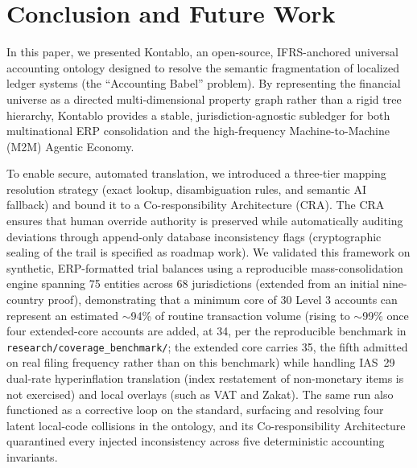 \section{Conclusion and Future Work}
\label{sec:conclusion}

In this paper, we presented Kontablo, an open-source, IFRS-anchored universal accounting ontology designed to resolve the semantic fragmentation of localized ledger systems (the ``Accounting Babel'' problem). By representing the financial universe as a directed multi-dimensional property graph rather than a rigid tree hierarchy, Kontablo provides a stable, jurisdiction-agnostic subledger for both multinational ERP consolidation and the high-frequency Machine-to-Machine (M2M) Agentic Economy.

To enable secure, automated translation, we introduced a three-tier mapping resolution strategy (exact lookup, disambiguation rules, and semantic AI fallback) and bound it to a Co-responsibility Architecture (CRA). The CRA ensures that human override authority is preserved while automatically auditing deviations through append-only database inconsistency flags (cryptographic sealing of the trail is specified as roadmap work). We validated this framework on synthetic, ERP-formatted trial balances using a reproducible mass-consolidation engine spanning 75 entities across 68 jurisdictions (extended from an initial nine-country proof), demonstrating that a minimum core of 30 Level 3 accounts can represent an estimated $\sim$94\% of routine transaction volume (rising to $\sim$99\% once four extended-core accounts are added, at 34, per the reproducible benchmark in \texttt{research/coverage\_benchmark/}; the extended core carries 35, the fifth admitted on real filing frequency rather than on this benchmark) while handling IAS~29 dual-rate hyperinflation translation (index restatement of non-monetary items is not exercised) and local overlays (such as VAT and Zakat). The same run also functioned as a corrective loop on the standard, surfacing and resolving four latent local-code collisions in the ontology, and its Co-responsibility Architecture quarantined every injected inconsistency across five deterministic accounting invariants.


